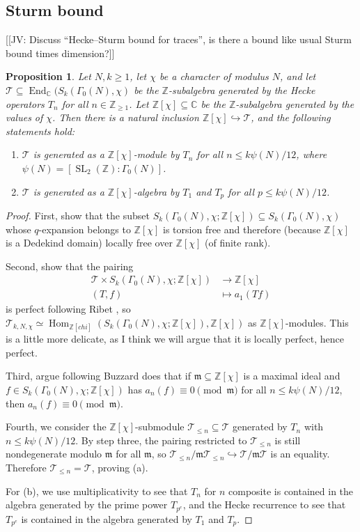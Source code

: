 \documentclass[11pt]{amsart}
\numberwithin{equation}{subsection}
\theoremstyle{plain}
\newtheorem{prop}[equation]{Proposition}
\theoremstyle{definition}
\newcommand{\Z}{\mathbb{Z}}
\newcommand{\C}{\mathbb{C}}
\newcommand{\TT}{\mathcal{T}}
\newcommand{\frakm}{\mathfrak{m}}
\DeclareMathOperator{\End}{End}
\DeclareMathOperator{\SL}{SL}
\DeclareMathOperator{\Hom}{Hom}
\newenvironment{enumalph}
{\begin{enumerate}\renewcommand{\labelenumi}{\textnormal{(\alph{enumi})}}}
{\end{enumerate}}
\newcommand{\jv}[1]{{\color{red} \textsf{[[JV: #1]]}}}
\begin{document}
\subsection{Sturm bound}

\jv{Discuss ``Hecke--Sturm bound for traces'', is there a bound like usual Sturm bound times dimension?}

\begin{prop}
Let $N,k \geq 1$, let $\chi$ be a character of modulus $N$, and let $\TT \subseteq \End_\C(S_k(\Gamma_0(N),\chi)$ be the $\Z$-subalgebra generated by the Hecke operators $T_n$ for all $n \in \Z_{\geq 1}$.  Let $\Z[\chi] \subseteq \C$ be the $\Z$-subalgebra generated by the values of $\chi$.  Then there is a natural inclusion $\Z[\chi] \hookrightarrow \TT$, and the following statements hold:
\begin{enumalph}
\item $\TT$ is generated as a $\Z[\chi]$-module by $T_n$ for all $n \leq k\psi(N)/12$, where $\psi(N)=[\SL_2(\Z):\Gamma_0(N)]$.
\item $\TT$ is generated as a $\Z[\chi]$-algebra by $T_1$ and $T_p$ for all $p \leq k\psi(N)/12$.
\end{enumalph}
\end{prop}

\begin{proof}
First, show that the subset $S_k(\Gamma_0(N),\chi;\Z[\chi]) \subseteq S_k(\Gamma_0(N),\chi)$ whose $q$-expansion belongs to $\Z[\chi]$ is torsion free and therefore (because $\Z[\chi]$ is a Dedekind domain) locally free over $\Z[\chi]$ (of finite rank).  

Second, show that the pairing
\begin{equation}
\begin{aligned} 
\TT \times S_k(\Gamma_0(N),\chi;\Z[\chi]) &\to \Z[\chi] \\
(T,f) &\mapsto a_1(Tf)
\end{aligned}
\end{equation}
is perfect following Ribet \cite[Theorem (2.2)]{Ribet:modp}, so $\TT_{k,N,\chi} \simeq \Hom_{\Z[chi]}(S_k(\Gamma_0(N),\chi;\Z[\chi]),\Z[\chi])$ as $\Z[\chi]$-modules.  This is a little more delicate, as I think we will argue that it is locally perfect, hence perfect.  

Third, argue following Buzzard does that if $\frakm \subseteq \Z[\chi]$ is a maximal ideal and $f \in S_k(\Gamma_0(N),\chi;\Z[\chi])$ has $a_n(f) \equiv 0 \pmod{\frakm}$ for all $n \leq k\psi(N)/12$, then $a_n(f) \equiv 0 \pmod{\frakm}$.  

Fourth, we consider the $\Z[\chi]$-submodule $\TT_{\leq n} \subseteq \TT$ generated by $T_n$ with $n \leq k\psi(N)/12$.  By step three, the pairing restricted to $\TT_{\leq n}$ is still nondegenerate modulo $\frakm$ for all $\frakm$, so $\TT_{\leq n}/\frakm \TT_{\leq n} \hookrightarrow \TT/\frakm \TT$ is an equality.  Therefore $\TT_{\leq n}=\TT$, proving (a).

For (b), we use multiplicativity to see that $T_n$ for $n$ composite is contained in the algebra generated by the prime power $T_{p^e}$, and the Hecke recurrence to see that $T_{p^e}$ is contained in the algebra generated by $T_1$ and $T_p$.
\end{proof}
\end{document}

